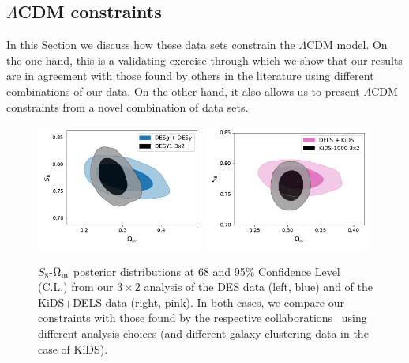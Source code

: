 \documentclass[a4paper,11pt]{article}
\newcommand{\Om}{\Omega_{\rm m}}
\newcommand{\lcdm}{$\Lambda$CDM\xspace}
\newcommand{\des}{DES\xspace}
\newcommand{\kids}{KiDS\xspace}
\newcommand{\dls}{DELS\xspace}
\begin{document}
    \subsection{\lcdm constraints}\label{ssec:res.lcdm}

      In this Section we discuss how these data sets constrain the \lcdm model. On the one hand, this is a validating exercise through which we show that our results are in agreement with those found by others in the literature using different combinations of our data. On the other hand, it also allows us to present \lcdm constraints from a novel combination of data sets.

      \begin{figure}
        \centering
        \includegraphics[width=0.49\textwidth]{figures/SD_lcdm_s8.pdf}
        \includegraphics[width=0.49\textwidth]{figures/ND_lcdm_s8.pdf}
        \caption{$S_8$-$\Om$ posterior distributions at 68 and 95\% Confidence Level (C.L.) from our $3\times2$ analysis of the \des data (left, blue) and of the \kids+\dls data (right, pink). In both cases, we compare our constraints with those found by the respective collaborations~\cite{1708.01530, 2007.15632} using different analysis choices (and different galaxy clustering data in the case of \kids).}
        \label{fig:ND_SD_lcdm_s8}
      \end{figure}
\end{document}
